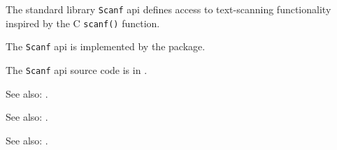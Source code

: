 
The standard library {\tt Scanf} api defines access to text-scanning functionality 
inspired by the C {\tt scanf()} function.

The {\tt Scanf} api is implemented by the  package.

The {\tt Scanf} api source code is in .

See also:  .

See also:  .

See also:  .

